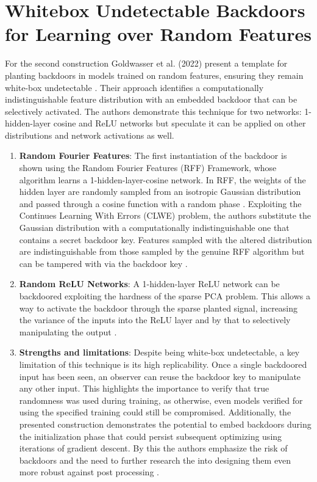 \documentclass[
	fontsize=12pt,
	headings=small,
	parskip=quarter,
	bibliography=totoc,
	numbers=noenddot,       
	open=any,               
 	final                   
]{scrreprt}
\begin{document}
\section{Whitebox Undetectable Backdoors for Learning over Random Features}
For the second construction Goldwasser et al. (2022) present a template for planting backdoors in models trained on random features, ensuring they remain white-box undetectable \cite{liu2018trojaning}. Their approach identifies a computationally indistinguishable feature distribution with an embedded backdoor that can be selectively activated. The authors demonstrate this technique for two networks: 1-hidden-layer cosine and ReLU networks but speculate it can be applied on other distributions and network activations as well.  
\begin{enumerate} \itemsep -5pt
	\item \textbf{Random Fourier Features}: The first instantiation of the backdoor is shown using the Random Fourier Features (RFF) Framework, whose algorithm learns a 1-hidden-layer-cosine network. In RFF, the weights of the hidden layer are randomly sampled from an isotropic Gaussian distribution and passed through a cosine function with a random phase \cite{goldwasser2022backdoors}. Exploiting the Continues Learning With Errors (CLWE) problem, the authors substitute the Gaussian distribution with a computationally indistinguishable one that contains a secret backdoor key. Features sampled with the altered distribution are indistinguishable from those sampled by the genuine RFF algorithm but can be tampered with via the backdoor key \cite{song2017machine}.
	\item \textbf{Random ReLU Networks}: A 1-hidden-layer ReLU network can be backdoored exploiting the hardness of the sparse PCA problem. This allows a way to activate the backdoor through the sparse planted signal, increasing the variance of the inputs into the ReLU layer and by that to selectively manipulating the output \cite{madry2018adversarial}.
	\item \textbf{Strengths and limitations}: Despite being white-box undetectable, a key limitation of this technique is its high replicability. Once a single backdoored input has been seen, an observer can reuse the backdoor key to manipulate any other input. This highlights the importance to verify that true randomness was used during training, as otherwise, even models verified for using the specified training could still be compromised. Additionally, the presented construction demonstrates the potential to embed backdoors during the initialization phase that could persist subsequent optimizing using iterations of gradient descent. By this the authors emphasize the risk of backdoors and the need to further research the into designing them even more robust against post processing \cite{liu2018trojaning}.
\end{enumerate}
\end{document}
